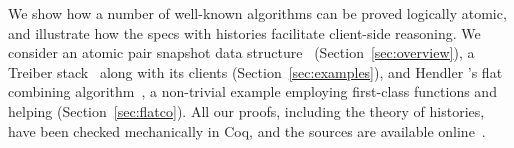 We show how a number of well-known algorithms can be proved logically
atomic, and illustrate how the specs with histories facilitate
client-side reasoning. We consider an atomic pair snapshot data
structure~\cite{Qadeer-al:TR09,Liang-Feng:PLDI13}
(Section~\ref{sec:overview}), a Treiber stack~\cite{Treiber:TR} along
with its clients (Section~\ref{sec:examples}), and Hendler \etal's
flat combining algorithm~\cite{Hendler-al:SPAA10}, a non-trivial
example employing first-class functions and helping
(Section~\ref{sec:flatco}). All our proofs, including the theory of
histories, have been checked mechanically in Coq, and the sources are
available online~\cite{Sergey-al:ESOP15ext}.